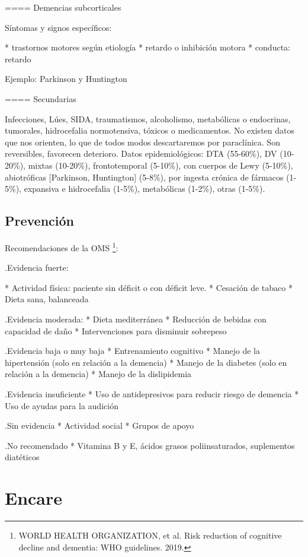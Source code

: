 ==== Demencias subcorticales

Síntomas y signos específicos:

* trastornos motores según etiología
* retardo o inhibición motora
* conducta: retardo

Ejemplo: Parkinson y Huntington

==== Secundarias

Infecciones, Lúes, SIDA, traumatismos, alcoholismo, metabólicas o endocrinas, tumorales, hidrocefalia normotensiva, tóxicos o medicamentos. No existen datos que nos orienten, lo que de todos modos descartaremos por paraclínica. Son reversibles, favorecen deterioro. Datos epidemiológicos: DTA (55-60\%), DV (10-20\%), mixtas (10-20\%), frontotemporal (5-10\%), con cuerpos de Lewy (5-10\%), abiotróficas [Parkinson, Huntington] (5-8\%), por ingesta crónica de fármacos (1-5\%), expansiva e hidrocefalia (1-5\%), metabólicas (1-2\%), otras (1-5\%).

\subsection*{Prevención}
Recomendaciones de la OMS \footnote{WORLD HEALTH ORGANIZATION, et al. Risk reduction of cognitive decline and dementia: WHO guidelines. 2019.}:

.Evidencia fuerte:

* Actividad física: paciente sin déficit o con déficit leve.
* Cesación de tabaco
* Dieta sana, balanceada

.Evidencia moderada:
* Dieta mediterránea
* Reducción de bebidas con capacidad de daño
* Intervenciones para disminuir sobrepeso

.Evidencia baja o muy baja
* Entrenamiento cognitivo
* Manejo de la hipertensión (solo en relación a la demencia)
* Manejo de la diabetes (solo en relación a la demencia)
* Manejo de la dislipidemia

.Evidencia insuficiente
* Uso de antidepresivos para reducir riesgo de demencia
* Uso de ayudas para la audición

.Sin evidencia
* Actividad social
* Grupos de apoyo

.No recomendado
* Vitamina B y E, ácidos grasos poliinsaturados, suplementos diatéticos

\section*{Encare}
